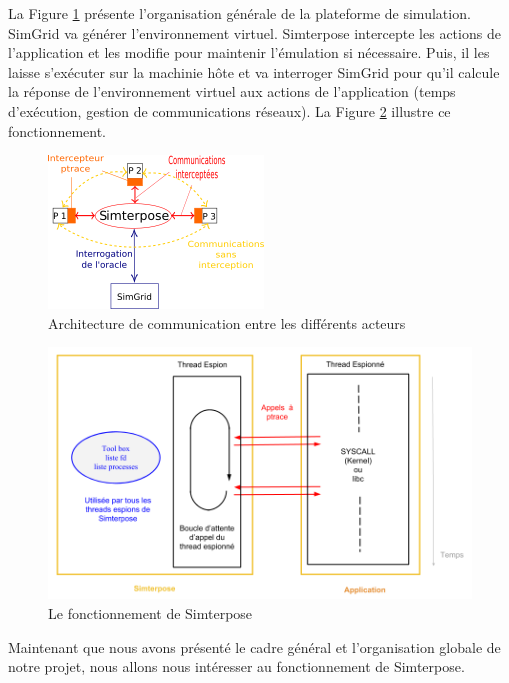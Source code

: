 La Figure \ref{Organisation_generale} présente l'organisation générale de la plateforme de simulation. SimGrid va générer l'environnement virtuel. Simterpose intercepte les
actions de l'application et les modifie pour maintenir l'émulation si
nécessaire. Puis, il les laisse
s'exécuter sur la machinie hôte et va interroger SimGrid pour qu'il calcule la
réponse de l'environnement virtuel aux actions de l'application (temps d'exécution, gestion de communications réseaux). La Figure \ref{Organisation_Simterpose} illustre ce fonctionnement.

\begin{figure}
  \centering
  \includegraphics{Pictures/png/Communications_Simterpose_interprocess_v2}
  \caption{Architecture de communication entre les différents acteurs}
  \label{Organisation_generale}
\end{figure}

\begin{figure}[H]
  \centering
  \includegraphics[scale=0.5]{Pictures/png/Simterpose_orga_code_v4}
  \caption{Le fonctionnement de Simterpose}
  \label{Organisation_Simterpose}
\end{figure}

Maintenant que nous avons présenté le cadre général et l'organisation globale
de notre projet, nous allons nous intéresser au fonctionnement de Simterpose.
